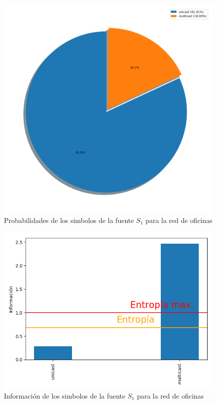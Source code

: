 \begin{figure}
\centering
 \includegraphics[scale=0.4]{../plots/trabajo_s1_probabilidades.png}
 \caption{Probabilidades de los simbolos de la fuente $S_1$ para la red de oficinas}
\end{figure}

\begin{figure}
 \centering
 \includegraphics[scale=0.6]{../plots/trabajo_s1_informacion.png}
 \caption{Información de los simbolos de la fuente $S_1$ para la red de oficinas}
\end{figure}


